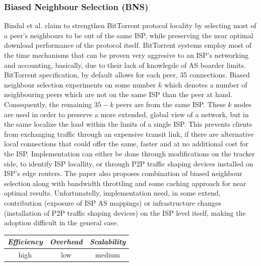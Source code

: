 \subsubsection{Biased Neighbour Selection (BNS)}
Bindal et al. \cite{BCCMSBZ2006} claim to strengthen BitTorrent
protocol\cite{c_bittorrent_2003} locality by selecting most of a peer's
neighbours to be out of the same ISP, while preserving the near optimal download
performance of the protocol itself. BitTorrent systems employ most of the time
mechanisms that can be proven very aggresive to an ISP's networking and
accounting, basically, due to their lack of knowlegde of AS boarder limits.
BitTorrent specification, by default allows for each peer, 35 connections.
Biased neighbour selection experiments on some number $k$ which denotes a number
of neighbouring peers which are not on the same ISP than the peer at hand.
Consequently, the remaining $35 - k$ peers are from the same ISP. These $k$
nodes are used in order to preserve a more extended, global view of a network,
but in the same localize the load within the limits of a single ISP. This
prevents clients from exchanging traffic through an expensive transit link, if
there are alternative local connections that could offer the same, faster and at
no additional cost for the ISP. Implementation can either be done through
modifications on the tracker side, to identify ISP locallity, or through P2P
traffic shaping devices installed on ISP's edge routers. The paper also proposes
combination of biased neighbour selection along with bandwidth throttling and
some caching approach for near optimal results. Unfortunatelly, implementation
need, in some extend, contribution (exposure of ISP AS mappings) or
infrastructure changes (installation of P2P traffic shaping devices) on the ISP
level itself, making the adoption difficult in the general case.

\begin{center}
\begin{tabular}{ccc}
\emph{Efficiency} & \emph{Overhead} & \emph{Scalability} \\
\hline
high &
low &
medium
\end{tabular}
\end{center}

